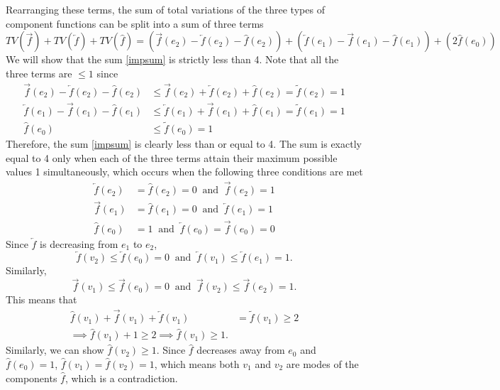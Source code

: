 \documentclass[11pt]{article}
\begin{document}
 Rearranging these terms, the sum of total variations of the three types of component functions can be split into a sum of three terms
  \begin{equation}
  \label{impsum}
 	TV(\overrightarrow{f}) +  TV(\overleftarrow{f}) +  TV(\widehat{f}) = \left( \overrightarrow{f}(e_2) - \overleftarrow{f}(e_2) - \widehat{f}(e_2) \right) + \left( \overleftarrow{f}(e_1) - \overrightarrow{f}(e_1) - \widehat{f}(e_1) \right) + \left( 2\widehat{f}(e_0) \right)
 \end{equation}
 We will show that the sum \eqref{impsum} is strictly less than 4. Note that all the three terms are $\leq 1$ since
 \begin{align*}
 \overrightarrow{f}(e_2) - \overleftarrow{f}(e_2) - \widehat{f}(e_2) &\leq \overrightarrow{f}(e_2) + \overleftarrow{f}(e_2) + \widehat{f}(e_2)  = \tilde{f}(e_2) = 1 \\
 \overleftarrow{f}(e_1) - \overrightarrow{f}(e_1) - \widehat{f}(e_1) &\leq \overleftarrow{f}(e_1) + \overrightarrow{f}(e_1) + \widehat{f}(e_1) = \tilde{f}(e_1) = 1 \\
 \widehat{f}(e_0) &\leq \tilde{f}(e_0) = 1
 \end{align*}
 Therefore, the sum \eqref{impsum} is clearly less than or equal to 4. The sum is exactly equal to 4 only when each of the three terms attain their maximum possible values 1 simultaneously, which occurs when the following three conditions are met
 \begin{align*}
 \overleftarrow{f}(e_2) &= \widehat{f}(e_2) = 0 \ \text{ and } \ \overrightarrow{f}(e_2) = 1 \\
 \overrightarrow{f}(e_1) &= \widehat{f}(e_1) = 0 \ \text{ and } \ \overleftarrow{f}(e_1) = 1 \\
 \widehat{f}(e_0) &= 1 \ \text{ and } \ \overleftarrow{f}(e_0) = \overrightarrow{f}(e_0) = 0
 \end{align*}
 Since $\overleftarrow{f}$ is decreasing from $e_1$ to $e_2$, 
 \[
 	\overleftarrow{f}(v_2) \leq \overleftarrow{f}(e_0) = 0 \ \text{ and } \ \overleftarrow{f}(v_1) \leq \overleftarrow{f}(e_1) = 1.
 \]
  Similarly, 
  \[
 	\overrightarrow{f}(v_1) \leq \overrightarrow{f}(e_0) = 0 \ \text{ and } \ \overrightarrow{f}(v_2) \leq \overrightarrow{f}(e_2) = 1.
 \]
 This means that
 \begin{align*}
 	\widehat{f}(v_1) + \overrightarrow{f}(v_1) + \overleftarrow{f}(v_1) &= \tilde{f}(v_1) \geq 2 \\
	\implies \widehat{f}(v_1) + 1 \geq 2 \implies \widehat{f}(v_1) \geq 1.
 \end{align*}
 Similarly, we can show $\widehat{f}(v_2) \geq 1$. Since $\widehat{f}$ decreases away from $e_0$ and $\widehat{f}(e_0) = 1$, $\widehat{f}(v_1) = \widehat{f}(v_2) = 1$, which means both $v_1$ and $v_2$ are modes of the components $\widehat{f}$, which is a contradiction.
 
\end{document}
